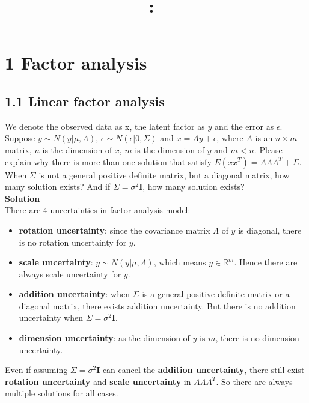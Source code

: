 \documentclass[20pt]{article}
\title{\hmwkClass:\ \textbf{\hmwkTitle}}
\date{\hmwkDueDate}
\author{\hmwkAuthorName}
\newcommand{\solution}{\textbf{\normalsize Solution}}
\newcommand{\I}{\mathbf{I}}
\begin{document}
\maketitle

\section*{1 Factor analysis}
 \subsection*{1.1 Linear factor analysis}
 {\color{blue} We denote the observed data as x, the latent factor as $y$ and the error as $\epsilon$. Suppose $y \sim N(y|\mu,\Lambda)$, $\epsilon \sim N(\epsilon|0, \Sigma)$ and $x = Ay + \epsilon$, where $A$ is an $n \times m$ matrix, $n$ is the dimension of $x$, $m$ is the dimension of $y$ and $m < n$. Please explain why there is more than one solution that satisfy $E(xx^T) = A\Lambda A^T + \Sigma$. When $\Sigma$ is not a general positive definite matrix, but a diagonal matrix, how many solution exists? And if $\Sigma = \sigma^2\I$, how many solution exists?
 } \\
 \solution \\
 There are 4 uncertainties in factor analysis model:
 \begin{itemize}
     \item \textbf{rotation uncertainty}: since the covariance matrix $\Lambda$ of $y$ is diagonal, there is no rotation uncertainty for $y$.
     \item \textbf{scale uncertainty}: $y \sim N(y|\mu,\Lambda)$, which means $y\in \mathbb{R}^m$. Hence there are always scale uncertainty for $y$.
     \item \textbf{addition uncertainty}: when $\Sigma$ is a general positive definite matrix or a diagonal matrix, there exists addition uncertainty. But there is no addition uncertainty when $\Sigma = \sigma^2\I$.
     \item \textbf{dimension uncertainty}: as the dimension of $y$ is $m$, there is no dimension uncertainty.
 \end{itemize}
 Even if assuming $\Sigma = \sigma^2\I$ can cancel the \textbf{addition uncertainty}, there still exist \textbf{rotation uncertainty} and \textbf{scale uncertainty} in $A\Lambda A^T$. So there are always multiple solutions for all cases.
\end{document}
